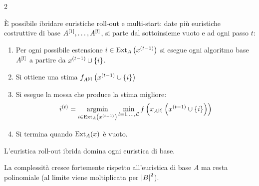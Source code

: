 \documentclass[\main/main.tex]{subfiles}
\begin{document}
\begin{multicols}{2}
\begin{observation}
    È possibile ibridare euristiche roll-out e multi-start: date più euristiche costruttive di base \(A^{\left[1\right]}, \ldots, A^{\left[l\right]}\), si parte dal sottoinsieme vuoto e ad ogni passo \(t\):
    \begin{enumerate}
        \item Per ogni possibile estensione \(i \in \text{Ext}_A\left(x^{(t-1)}\right)\) si esegue ogni algoritmo base \(A^{\left[l\right]}\) a partire da \(x^{\left(t-1\right)} \cup \left\{i\right\}\).
        \item Si ottiene una stima \(f_{A^{\left[l\right]}}\left(x^{\left(t-1\right)} \cup \left\{i\right\}\right)\)
        \item Si esegue la mossa che produce la stima migliore:
        \[
            i^{\left(t\right)} = \operatorname*{argmin}_{i \in \text{Ext}_A\left(x^{\left(t-1\right)}\right)} \min_{l = 1,\ldots,\mathcal{L}} f\left(x_{A^{\left[l\right]}}\left(x^{\left(t-1\right)} \cup \left\{i\right\}\right)\right)
        \]
        \item Si termina quando \(\text{Ext}_A(x)\) è vuoto.
    \end{enumerate}
    
    L'euristica roll-out ibrida domina ogni euristica di base.
    
    La complessità cresce fortemente rispetto all'euristica di base \(A\) ma resta polinomiale (al limite viene moltiplicata per \(\left\lvert B\right\rvert^2\)).
\end{observation}
\end{multicols}
\end{document}
